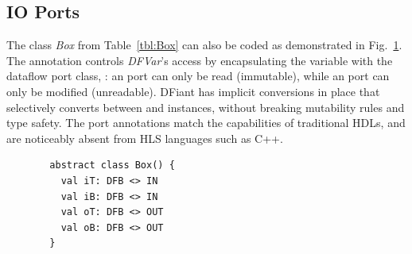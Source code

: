 

\subsection{IO Ports}
\label{sec:io_ports}
The class \textit{Box} from Table~\ref{tbl:Box} can also be coded as demonstrated in Fig.~\ref{fig:IOBox}. The annotation  controls \textit{DFVar}'s access by encapsulating the variable with the dataflow port class, : an  port can only be read (immutable), while an  port can only be modified (unreadable). DFiant has implicit conversions in place that selectively converts between  and  instances, without breaking mutability rules and type safety. The port annotations match the capabilities of traditional HDLs, and are noticeably absent from HLS languages such as C++. 


\begin{figure}[h]
  \centering
  \begin{minipage}{0.4\linewidth}
  \begin{verbatim}
  abstract class Box() { 
    val iT: DFB <> IN
    val iB: DFB <> IN
    val oT: DFB <> OUT
    val oB: DFB <> OUT
  }
  \end{verbatim}
  \end{minipage}
  \label{fig:IOBox}
\end{figure}



%
%
%
%
%

